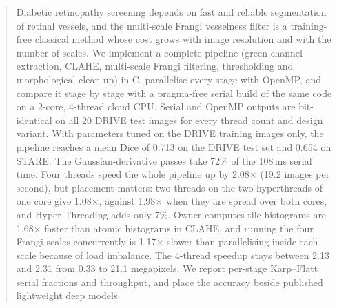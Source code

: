 \begin{abstract}
Diabetic retinopathy screening depends on fast and reliable segmentation of retinal vessels, and the
multi-scale Frangi vesselness filter is a training-free classical method whose cost grows with image resolution
and with the number of scales. We implement a complete pipeline (green-channel extraction, CLAHE, multi-scale
Frangi filtering, thresholding and morphological clean-up) in C, parallelise every stage with OpenMP, and
compare it stage by stage with a pragma-free serial build of the same code on a 2-core, 4-thread cloud CPU.
Serial and OpenMP outputs are bit-identical on all 20 DRIVE test images for every thread count and design
variant. With parameters tuned on the DRIVE training images only, the pipeline reaches a mean Dice of 0.713 on
the DRIVE test set and 0.654 on STARE. The Gaussian-derivative passes take 72\% of the 108\,ms serial time.
Four threads speed the whole pipeline up by 2.08$\times$ (19.2 images per second), but placement matters: two
threads on the two hyperthreads of one core give 1.08$\times$, against 1.98$\times$ when they are spread over
both cores, and Hyper-Threading adds only 7\%. Owner-computes tile histograms are 1.68$\times$ faster than atomic
histograms in CLAHE, and running the four Frangi scales concurrently is 1.17$\times$ slower than parallelising
inside each scale because of load imbalance. The 4-thread speedup stays between 2.13 and 2.31 from 0.33 to 21.1
megapixels. We report per-stage Karp--Flatt serial fractions and throughput, and place the accuracy beside
published lightweight deep models.
\end{abstract}
